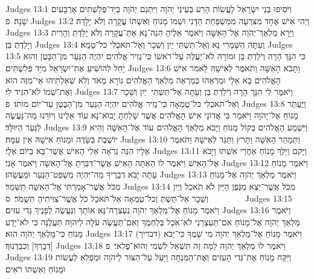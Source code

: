 Judges 13:1	וַיֹּסִיפוּ בְּנֵי יִשְׂרָאֵל לַעֲשׂוֹת הָרַע בְּעֵינֵי יְהֹוָה וַיִּתְּנֵם יְהֹוָה בְּיַד־פְּלִשְׁתִּים אַרְבָּעִים שָׁנָה׃ {פ}
Judges 13:2	וַיְהִי אִישׁ אֶחָד מִצּרְעָה מִמִּשְׁפַּחַת הַדָּנִי וּשְׁמוֹ מָנוֹחַ וְאִשְׁתּוֹ עֲקָרָה וְלֹא יָלָדָה׃
Judges 13:3	וַיֵּרָא מַלְאַךְ־יְהֹוָה אֶל־הָאִשָּׁה וַיֹּאמֶר אֵלֶיהָ הִנֵּה־נָא אַתְּ־עֲקָרָה וְלֹא יָלַדְתְּ וְהָרִית וְיָלַדְתְּ בֵּן׃
Judges 13:4	וְעַתָּה הִשָּׁמְרִי נָא וְאַל־תִּשְׁתִּי יַיִן וְשֵׁכָר וְאַל־תֹּאכְלִי כּל־טָמֵא׃
Judges 13:5	כִּי הִנָּךְ הָרָה וְיֹלַדְתְּ בֵּן וּמוֹרָה לֹא־יַעֲלֶה עַל־רֹאשׁוֹ כִּי־נְזִיר אֱלֹהִים יִהְיֶה הַנַּעַר מִן־הַבָּטֶן וְהוּא יָחֵל לְהוֹשִׁיעַ אֶת־יִשְׂרָאֵל מִיַּד פְּלִשְׁתִּים׃
Judges 13:6	וַתָּבֹא הָאִשָּׁה וַתֹּאמֶר לְאִישָׁהּ לֵאמֹר אִישׁ הָאֱלֹהִים בָּא אֵלַי וּמַרְאֵהוּ כְּמַרְאֵה מַלְאַךְ הָאֱלֹהִים נוֹרָא מְאֹד וְלֹא שְׁאִלְתִּיהוּ אֵי־מִזֶּה הוּא וְאֶת־שְׁמוֹ לֹא־הִגִּיד לִי׃
Judges 13:7	וַיֹּאמֶר לִי הִנָּךְ הָרָה וְיֹלַדְתְּ בֵּן וְעַתָּה אַל־תִּשְׁתִּי  יַיִן וְשֵׁכָר וְאַל־תֹּאכְלִי כּל־טֻמְאָה כִּי־נְזִיר אֱלֹהִים יִהְיֶה הַנַּעַר מִן־הַבֶּטֶן עַד־יוֹם מוֹתוֹ׃ {פ}
Judges 13:8	וַיֶּעְתַּר מָנוֹחַ אֶל־יְהֹוָה וַיֹּאמַר בִּי אֲדוֹנָי אִישׁ הָאֱלֹהִים אֲשֶׁר שָׁלַחְתָּ יָבוֹא־נָא עוֹד אֵלֵינוּ וְיוֹרֵנוּ מַה־נַּעֲשֶׂה לַנַּעַר הַיּוּלָּד׃
Judges 13:9	וַיִּשְׁמַע הָאֱלֹהִים בְּקוֹל מָנוֹחַ וַיָּבֹא מַלְאַךְ הָאֱלֹהִים עוֹד אֶל־הָאִשָּׁה וְהִיא יוֹשֶׁבֶת בַּשָּׂדֶה וּמָנוֹחַ אִישָׁהּ אֵין עִמָּהּ׃
Judges 13:10	וַתְּמַהֵר הָאִשָּׁה וַתָּרץ וַתַּגֵּד לְאִישָׁהּ וַתֹּאמֶר אֵלָיו הִנֵּה נִרְאָה אֵלַי הָאִישׁ אֲשֶׁר־בָּא בַיּוֹם אֵלָי׃
Judges 13:11	וַיָּקם וַיֵּלֶךְ מָנוֹחַ אַחֲרֵי אִשְׁתּוֹ וַיָּבֹא אֶל־הָאִישׁ וַיֹּאמֶר לוֹ הַאַתָּה הָאִישׁ אֲשֶׁר־דִּבַּרְתָּ אֶל־הָאִשָּׁה וַיֹּאמֶר אָנִי׃
Judges 13:12	וַיֹּאמֶר מָנוֹחַ עַתָּה יָבֹא דְבָרֶיךָ מַה־יִּהְיֶה מִשְׁפַּט־הַנַּעַר וּמַעֲשֵׂהוּ׃
Judges 13:13	וַיֹּאמֶר מַלְאַךְ יְהֹוָה אֶל־מָנוֹחַ מִכֹּל אֲשֶׁר־אָמַרְתִּי אֶל־הָאִשָּׁה תִּשָּׁמֵר׃
Judges 13:14	מִכֹּל אֲשֶׁר־יֵצֵא מִגֶּפֶן הַיַּיִן לֹא תֹאכַל וְיַיִן וְשֵׁכָר אַל־תֵּשְׁתְּ וְכל־טֻמְאָה אַל־תֹּאכַל כֹּל אֲשֶׁר־צִוִּיתִיהָ תִּשְׁמֹר׃ {ס}        
Judges 13:15	וַיֹּאמֶר מָנוֹחַ אֶל־מַלְאַךְ יְהֹוָה נַעְצְרָה־נָּא אוֹתָךְ וְנַעֲשֶׂה לְפָנֶיךָ גְּדִי עִזִּים׃
Judges 13:16	וַיֹּאמֶר מַלְאַךְ יְהֹוָה אֶל־מָנוֹחַ אִם־תַּעְצְרֵנִי לֹא־אֹכַל בְּלַחְמֶךָ וְאִם־תַּעֲשֶׂה עֹלָה לַיהֹוָה תַּעֲלֶנָּה כִּי לֹא־יָדַע מָנוֹחַ כִּי־מַלְאַךְ יְהֹוָה הוּא׃
Judges 13:17	וַיֹּאמֶר מָנוֹחַ אֶל־מַלְאַךְ יְהֹוָה מִי שְׁמֶךָ כִּי־יָבֹא (דבריך) [דְבָרְךָ] וְכִבַּדְנוּךָ׃
Judges 13:18	וַיֹּאמֶר לוֹ מַלְאַךְ יְהֹוָה לָמָּה זֶּה תִּשְׁאַל לִשְׁמִי וְהוּא־פֶלִאי׃ {פ}
Judges 13:19	וַיִּקַּח מָנוֹחַ אֶת־גְּדִי הָעִזִּים וְאֶת־הַמִּנְחָה וַיַּעַל עַל־הַצּוּר לַיהֹוָה וּמַפְלִא לַעֲשׂוֹת וּמָנוֹחַ וְאִשְׁתּוֹ רֹאִים׃
